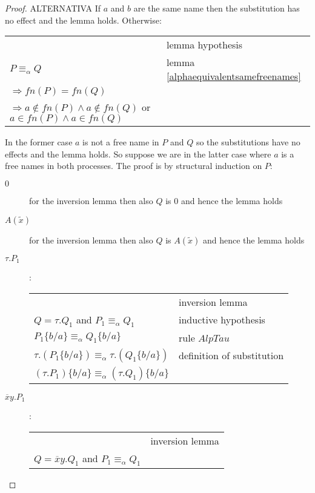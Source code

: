   \begin{proof}
    ALTERNATIVA
    If $a$ and $b$ are the same name then the substitution has no effect and the lemma holds. Otherwise:
    \begin{center}
      \begin{tabular}{ll}
	&lemma hypothesis\\
	$P \equiv_{\alpha} Q$&lemma \ref{alphaequivalentsamefreenames}\\
	$\Rightarrow fn(P) = fn(Q)$&\\
	$\Rightarrow a\notin fn(P) \wedge a\notin fn(Q)$ or $a\in fn(P) \wedge a\in fn(Q)$&\\
      \end{tabular}
    \end{center}
    In the former case $a$ is not a free name in $P$ and $Q$ so the substitutions have no effects and the lemma holds. So suppose we are in the latter case where $a$ is a free names in both processes.
    The proof is by structural induction on $P$:
    \begin{description}
      \item[$0$]
	for the inversion lemma then also $Q$ is $0$ and hence the lemma holds
      \item[$A(\tilde{x})$]
	for the inversion lemma then also $Q$ is $A(\tilde{x})$ and hence the lemma holds
      \item[$\tau.P_{1}$]:
	\begin{center}
	  \begin{tabular}{ll}
	      &
		inversion lemma 
	    \\
		$Q=\tau.Q_{1}$ and $P_{1}\equiv_{\alpha} Q_{1}$
	      &
		inductive hypothesis
	    \\
		$P_{1}\{b/a\}\equiv_{\alpha} Q_{1}\{b/a\}$
	      &
		rule $AlpTau$
	    \\
		$\tau.(P_{1}\{b/a\})\equiv_{\alpha} \tau.(Q_{1}\{b/a\})$
	      &
		definition of substitution
	    \\
		$(\tau.P_{1})\{b/a\}\equiv_{\alpha} (\tau.Q_{1})\{b/a\}$
	      &
	    \\
	  \end{tabular}
	\end{center}
      \item[$\overline{x}y.P_{1}$]:
	\begin{center}
	  \begin{tabular}{ll}
	      &
		inversion lemma 
	    \\
		$Q=\overline{x}y.Q_{1}$ and $P_{1}\equiv_{\alpha} Q_{1}$
	      &

\end{tabular}
\end{center}
\end{description}
\end{proof}
